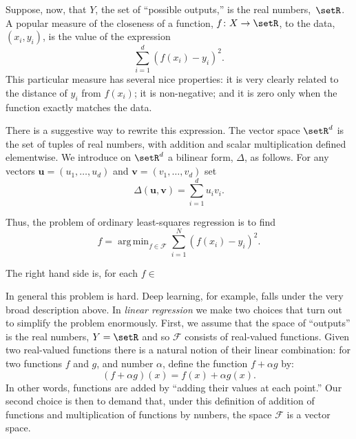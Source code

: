 \documentclass[10pt, a4paper]{article}
\DeclareMathOperator*{\argmin}{arg\,min}
\begin{document}
Suppose, now, that $Y$, the set of “possible outputs,” is the real
numbers,~$\setR$. A popular measure of the closeness of a function,
$f\colon X\to\setR$, to the data, $(x_i, y_i)$, is the value of the expression
\[
\sum_{i=1}^d{(f(x_i) - y_i)}^2.
\]
This particular measure has several nice properties: it is very
clearly related to the distance of $y_i$ from $f(x_i)$; it is
non-negative; and it is zero only when the function exactly matches
the data.

There is a suggestive way to rewrite this expression. The vector space
$\setR^d$ is the set of tuples of real numbers, with addition and
scalar multiplication defined elementwise. We introduce on $\setR^d$ a
bilinear form, $\Delta$, as follows. For any vectors
$\bm{u} = (u_1,\dotsc,u_d)$ and $\bm{v}=(v_1,\dotsc,v_d)$ set
\[
\Delta(\bm{u}, \bm{v}) = \sum_{i=1}^d u_iv_i.
\]


Thus,
the problem of ordinary least-squares regression is to find
\[
  \hat{f} = \argmin_{f\in\mathcal{F}} \sum_{i=1}^N {(f(x_i) - y_i)}^2.
\]

The right hand side is, for each $f\in$



In general this problem is hard. Deep learning, for example, falls
under the very broad description above. In \emph{linear regression} we
make two choices that turn out to simplify the problem enormously.
First, we assume that the space of “outputs” is the real numbers, $Y =
\setR$ and so $\mathcal{F}$ consists of real-valued functions. Given two
real-valued functions there is a natural notion of their linear
combination: for two functions $f$ and $g$, and number $\alpha$, define the
function $f+\alpha g$ by:
\begin{equation*}
  (f+\alpha g)(x) = f(x) + \alpha g(x).
\end{equation*}
In other words, functions are added by “adding their values at each
point.” Our second choice is then to demand that, under this
definition of addition of functions and multiplication of functions by
nunbers, the space $\mathcal{F}$ is a vector space.
\end{document}
